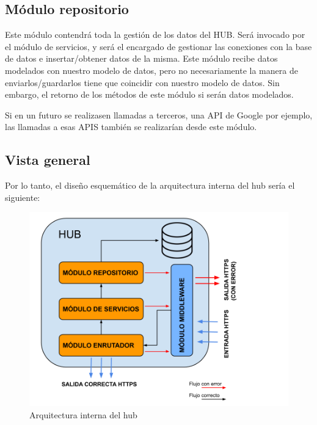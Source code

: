 \subsection{Módulo repositorio}
Este módulo contendrá toda la gestión de los datos del HUB. Será invocado por el módulo de servicios, y 
será el encargado de gestionar las conexiones con la base de datos e insertar/obtener datos de la misma.
Este módulo recibe datos modelados con nuestro modelo de datos, pero no necesariamente la manera de enviarlos/guardarlos tiene que coincidir con nuestro modelo 
de datos. Sin embargo, el retorno de los métodos de este módulo si serán datos modelados.
\par
Si en un futuro se realizasen llamadas a terceros, una API de Google por ejemplo, las llamadas a esas APIS también se realizarían desde este módulo.
\subsection{Vista general}
Por lo tanto, el diseño esquemático de la arquitectura interna del hub sería el siguiente:
\begin{figure}[H]
\centering
\includegraphics[width=6.00in]{images/arquitectura_hub.png}
\caption{Arquitectura interna del hub}
\label{fig:arquitectura_hub}
\end{figure}
